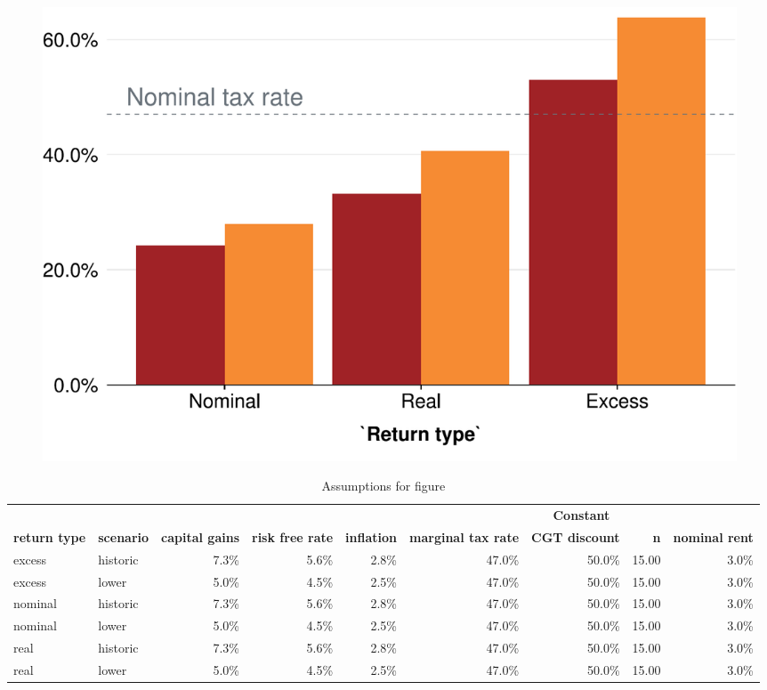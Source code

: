 \documentclass{grattan}\usepackage[]{graphicx}\usepackage[]{color}
\begin{document}
\begin{figure}


\includegraphics[width=\columnwidth]{CGT-NG-atlas//EMTR-nominal-real-excess-historic-vs-lower-1}
\end{figure}
\begin{table}
\centering
\caption{Assumptions for figure }
\small
\begin{tabular}{llrrrrrrr}
  \toprule
   &  &  &  &  & \multicolumn{4}{c}{\textbf{Constant}}\\
 \cmidrule(lr){6-9}
 \textbf{return type} & \textbf{scenario} & \textbf{capital gains} & \textbf{risk free rate} & \textbf{inflation} & \textbf{marginal tax rate} & \textbf{CGT discount} & \textbf{n} & \textbf{nominal rent}\\
 \midrule
excess & historic & 7.3\% & 5.6\% & 2.8\% & 47.0\% & 50.0\% & 15.00 & 3.0\% \\ 
  excess & lower & 5.0\% & 4.5\% & 2.5\% & 47.0\% & 50.0\% & 15.00 & 3.0\% \\ 
  nominal & historic & 7.3\% & 5.6\% & 2.8\% & 47.0\% & 50.0\% & 15.00 & 3.0\% \\ 
  nominal & lower & 5.0\% & 4.5\% & 2.5\% & 47.0\% & 50.0\% & 15.00 & 3.0\% \\ 
  real & historic & 7.3\% & 5.6\% & 2.8\% & 47.0\% & 50.0\% & 15.00 & 3.0\% \\ 
  real & lower & 5.0\% & 4.5\% & 2.5\% & 47.0\% & 50.0\% & 15.00 & 3.0\% \\ 
   \bottomrule
\end{tabular}

\end{table}
\end{document}

